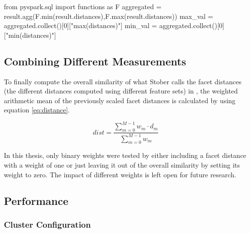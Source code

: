 \begin{pythonCode}[frame=single,label={lst:mindf2},caption={Minimum and maximum aggregation optimized},captionpos=b]
from pyspark.sql import functions as F
aggregated = result.agg(F.min(result.distances),F.max(result.distances))
max_val = aggregated.collect()[0]["max(distances)"]
min_val = aggregated.collect()[0]["min(distances)"]
\end{pythonCode}


\subsection{Combining Different Measurements}\label{weighedsum}

To finally compute the overall similarity of what Stober calls the facet distances (the different distances computed using different feature sets) in \cite[pp. 543ff]{musicdata}, the weighted arithmetic mean of the previously scaled facet distances is calculated by using equation \eqref{eq:distance}.

\begin{equation} \label{eq:distance}
dist = \frac{\sum_{m = 0}^{M - 1}{w_m \cdot d_m}}{\sum_{m = 0}^{M - 1}{w_m}}
\end{equation}

\noindent In this thesis, only binary weights were tested by either including a facet distance with a weight of one or just leaving it out of the overall similarity by setting its weight to zero. The impact of different weights is left open for future research. 

\subsection{Performance}\label{sparkperf}

\subsubsection{Cluster Configuration} %

